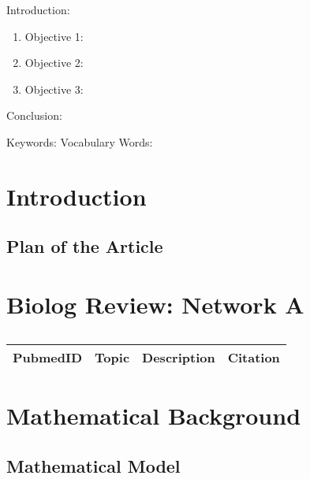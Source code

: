 

\twocolumn
\scriptsize
\begin{frontmatter}
		\title{}
		\author{}
		\address{The Mathematical Learning Space}
\end{frontmatter}	

Introduction:
\begin{enumerate}
\item Objective 1:
\item Objective 2:
\item Objective 3:
\end{enumerate}
Conclusion:

Keywords:
Vocabulary Words:

\section{Introduction}

\subsection{Plan of the Article}


\section{Biolog Review: Network A}

\centering	
\begin{table}[H]\tiny
	\caption{}	
	\begin{tabular}{rp{1cm}|p{4cm}|l}
		\hline	
		PubmedID & Topic & Description & Citation \\
		\hline 
		\hline 
	\end{tabular}
\end{table}


\section{Mathematical Background}

\subsection{Mathematical Model}

